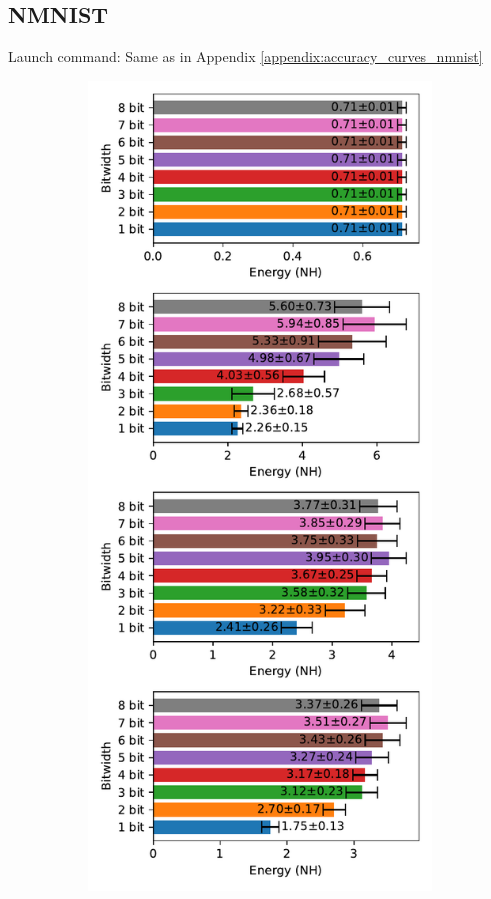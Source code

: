     \subsection{NMNIST}
    \label{appendix:energy_neuromorphic_nmnist}
        Launch command: Same as in Appendix \ref{appendix:accuracy_curves_nmnist}

        \begin{figure}[H]
            \centering
            \begin{subfigure}[H]{0.495\textwidth}
                \includegraphics[width=\textwidth]{../standard/NMNIST/plots/nmnist_test_energy_nh.pdf}

\end{subfigure}
\end{figure}
